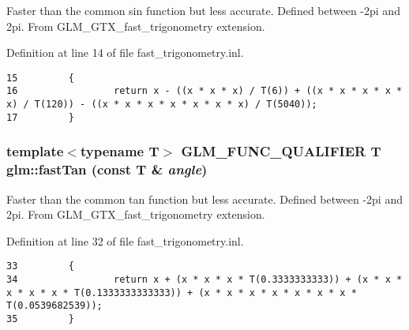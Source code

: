 Faster than the common sin function but less accurate. Defined between -2pi and 2pi. From GLM\_\-GTX\_\-fast\_\-trigonometry extension. 

Definition at line 14 of file fast\_\-trigonometry.inl.

\begin{Code}\begin{verbatim}15         {
16                 return x - ((x * x * x) / T(6)) + ((x * x * x * x * x) / T(120)) - ((x * x * x * x * x * x * x) / T(5040));
17         }
\end{verbatim}
\end{Code}


\hypertarget{group__gtx__fast__trigonometry_gd182bf6a962a33e47d5f6daf06ca3d6b}{
\subsubsection[fastTan]{\setlength{\rightskip}{0pt plus 5cm}template$<$typename T$>$ GLM\_\-FUNC\_\-QUALIFIER T glm::fastTan (const T \& {\em angle})}}
\label{group__gtx__fast__trigonometry_gd182bf6a962a33e47d5f6daf06ca3d6b}


Faster than the common tan function but less accurate. Defined between -2pi and 2pi. From GLM\_\-GTX\_\-fast\_\-trigonometry extension. 

Definition at line 32 of file fast\_\-trigonometry.inl.

\begin{Code}\begin{verbatim}33         {
34                 return x + (x * x * x * T(0.3333333333)) + (x * x * x * x * x * T(0.1333333333333)) + (x * x * x * x * x * x * x * T(0.0539682539));
35         }
\end{verbatim}
\end{Code}


